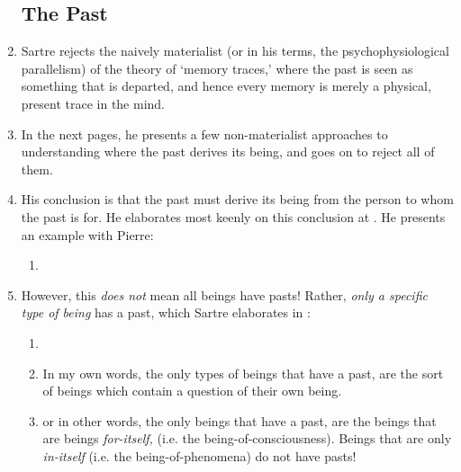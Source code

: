 \begin{enumerate}
  \subsection*{The Past}
  \item Sartre rejects the naively materialist (or in his terms, the psychophysiological parallelism) of the theory of `memory traces,' where the past is seen as something that is departed, and hence every memory is merely a physical, present trace in the mind.
  \item In the next pages, he presents a few non-materialist approaches to understanding where the past derives its being, and goes on to reject all of them.
  \item His conclusion is that the past must derive its being from the person to whom the past is for. He elaborates most keenly on this conclusion at \autocite[169]{sartre}. He presents an example with Pierre:
  \begin{enumerate}
    \item {}
  \end{enumerate}
  \item {} However, this \emph{does not} mean all beings have pasts! Rather, \emph{only a specific type of being} has a past, which Sartre elaborates in \autocite[172]{sartre}:
  \begin{enumerate}
    \item {}
    \item In my own words, the only types of beings that have a past, are the sort of beings which contain a question of their own being.
    \item or in other words, the only beings that have a past, are the beings that are beings \emph{for-itself,} (i.e. the being-of-consciousness). Beings that are only \emph{in-itself} (i.e. the being-of-phenomena) do not have pasts!

\end{enumerate}
\end{enumerate}
